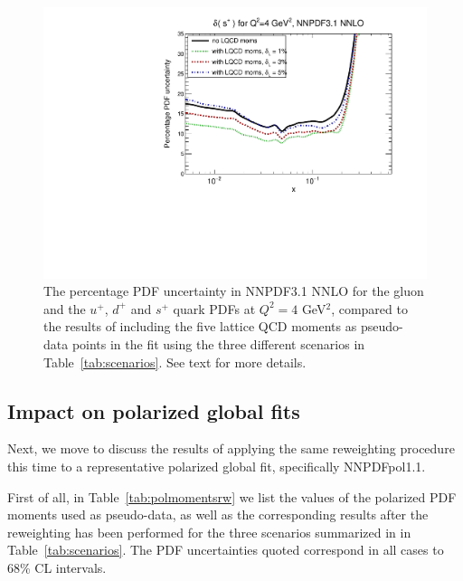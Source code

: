 \begin{figure}[!t]
\includegraphics[scale=0.45]{plots/xsp-unpol-lattice-relerr.pdf}
\caption{\small The percentage PDF uncertainty in NNPDF3.1 NNLO
  for the gluon and the $u^+$, $d^+$ and $s^+$ quark PDFs at
  $Q^2=4$ GeV$^2$,
  compared to the results of including the five lattice
  QCD moments as pseudo-data points in the fit using the three
  different scenarios in  Table~\ref{tab:scenarios}.
See text for more details.
}    
\label{fig:impactUnpol}
\end{figure}

\subsection{Impact on polarized global fits}

Next, we move to discuss the results of applying the same
reweighting procedure this time to a representative polarized
global fit, specifically NNPDFpol1.1.

First of all, in Table~\ref{tab:polmomentsrw}
we list the values of the polarized PDF moments
  used as pseudo-data, as well as the corresponding results
  after the reweighting has been performed for the
three scenarios summarized in 
in Table~\ref{tab:scenarios}.
%
The PDF uncertainties quoted correspond in all cases to 68\%
CL intervals.


